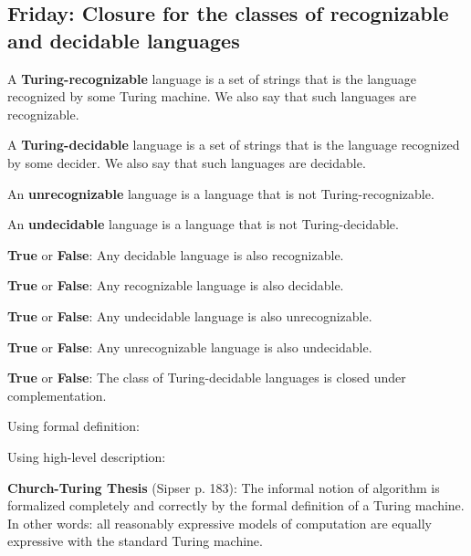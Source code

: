 \documentclass[12pt, oneside]{article}
\begin{document}
 

\newpage
\subsection*{Friday: Closure for the classes of recognizable and decidable languages}





A {\bf Turing-recognizable} language is a set of strings that 
is the language recognized by some Turing machine. We also 
say that such languages are recognizable.

A {\bf Turing-decidable} language is a set of strings that 
is the language recognized by some decider. We also 
say that such languages are decidable.


An {\bf unrecognizable} language is a language that is not Turing-recognizable.

An {\bf undecidable} language is a language that is not Turing-decidable.

\vfill

{\bf  True} or {\bf False}: Any  decidable language  is  also  recognizable.

\vfill

{\bf  True} or {\bf False}: Any  recognizable language  is  also  decidable.

\vfill

{\bf  True} or {\bf False}: Any  undecidable language  is  also  unrecognizable.

\vfill

{\bf  True} or {\bf False}: Any  unrecognizable language  is  also  undecidable.

\vfill

\newpage


{\bf True} or {\bf False}: The class of Turing-decidable languages is closed under complementation.

\vfill

Using formal definition:
\vfill

Using high-level description:
\vfill


{\bf  Church-Turing Thesis} (Sipser p. 183): The informal notion of algorithm is formalized completely  and correctly by the 
formal definition of a  Turing machine. In other words: all reasonably expressive models of 
computation are equally expressive with the standard Turing machine.
 
\end{document}
